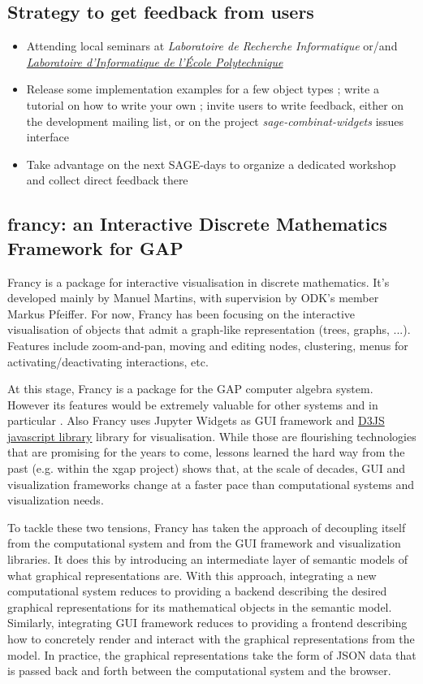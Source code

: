 \documentclass{deliverablereport}
\begin{document}
\subsection{Strategy to get feedback from users}

\begin{itemize}
  \item Attending local seminars at \emph{Laboratoire de Recherche Informatique} or/and \emph{\href{https://www.lix.polytechnique.fr/}{Laboratoire d'Informatique de l'École Polytechnique}}
  \item Release some implementation examples for a few object types ; write a tutorial on how to write your own ; invite users to write feedback, either on the development mailing list, or on the  project \emph{sage-combinat-widgets} issues interface
  \item Take advantage on the next SAGE-days to organize a dedicated workshop and collect direct feedback there
\end{itemize}

\subsection{francy: an Interactive Discrete Mathematics Framework for GAP}
\label{francy}

Francy is a package for interactive visualisation in discrete
mathematics. It's developed mainly by Manuel Martins, with supervision
by ODK's member Markus Pfeiffer. For now, Francy has been focusing on
the interactive visualisation of objects that admit a graph-like
representation (trees, graphs, ...). Features include zoom-and-pan,
moving and editing nodes, clustering, menus for
activating/deactivating interactions, etc.

At this stage, Francy is a package for the GAP computer algebra
system. However its features would be extremely valuable for other
systems and in particular \Sage. Also Francy uses Jupyter Widgets as
GUI framework and \href{d3js.org}{D3JS javascript library} library for
visualisation. %
While those are flourishing technologies that are promising for the
years to come, lessons learned the hard way from the past (e.g. within
the xgap project) shows that, at the scale of decades, GUI and
visualization frameworks change at a faster pace than computational
systems and visualization needs.

To tackle these two tensions, Francy has taken the approach of
decoupling itself from the computational system and from the GUI
framework and visualization libraries. It does this by introducing an
intermediate layer of semantic models of what graphical
representations are. With this approach, integrating a new
computational system reduces to providing a backend describing the
desired graphical representations for its mathematical objects in the
semantic model. Similarly, integrating GUI framework reduces to
providing a frontend describing how to concretely render and interact
with the graphical representations from the model. In practice, the
graphical representations take the form of JSON data that is passed
back and forth between the computational system and the browser.
\end{document}
